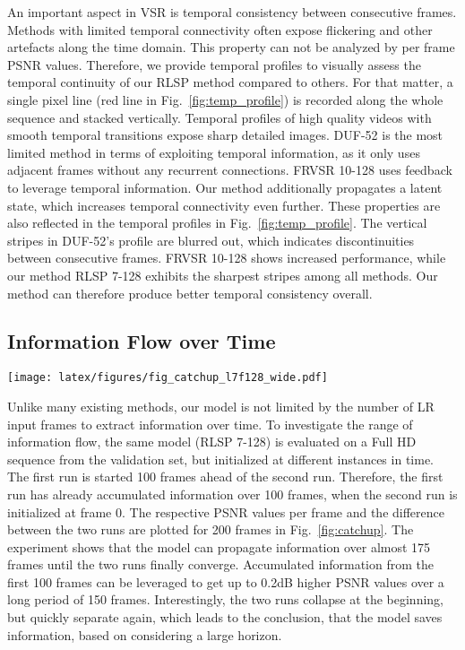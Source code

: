 \documentclass[10pt,twocolumn,letterpaper]{article}
\begin{document}
An important aspect in VSR is temporal consistency between consecutive frames. Methods with limited temporal connectivity often expose flickering and other artefacts along the time domain. This property can not be analyzed by per frame PSNR values. Therefore, we provide temporal profiles to visually assess the temporal continuity of our RLSP method compared to others. For that matter, a single pixel line (red line in Fig.~\ref{fig:temp_profile}) is recorded along the whole sequence and stacked vertically. Temporal profiles of high quality videos with smooth temporal transitions expose sharp detailed images. 
DUF-52 is the most limited method in terms of exploiting temporal information, as it only uses adjacent frames without any recurrent connections. FRVSR 10-128 uses feedback to leverage temporal information. Our method additionally propagates a latent state, which increases temporal connectivity even further.
These properties are also reflected in the temporal profiles in Fig.~\ref{fig:temp_profile}. The vertical stripes in DUF-52's profile are blurred out, which indicates discontinuities between consecutive frames. FRVSR 10-128 shows increased performance, while our method RLSP 7-128 exhibits the sharpest stripes among all methods. Our method can therefore produce better temporal consistency overall.


\subsection{Information Flow over Time}

\begin{figure*}[th!]
\begin{center}

\texttt{[image: latex/figures/fig\_catchup\_l7f128\_wide.pdf]}
\end{center}
   \caption{Information flow over time for model RLSP 7-128 on a validation video. Top: Absolute PSNR values, Bottom: Difference in PSNR per frame.}
\label{fig:catchup}
\end{figure*}

Unlike many existing methods, our model is not limited by the number of LR input frames to extract information over time. To investigate the range of information flow, the same model (RLSP 7-128) is evaluated on a Full HD sequence from the validation set, but initialized at different instances in time. The first run is started 100 frames ahead of the second run. Therefore, the first run has already accumulated information over 100 frames, when the second run is initialized at frame 0. The respective PSNR values per frame and the difference between the two runs are plotted for 200 frames in Fig.~\ref{fig:catchup}.
The experiment shows that the model can propagate information over almost 175 frames until the two runs finally converge. Accumulated information from the first 100 frames can be leveraged to get up to 0.2dB higher PSNR values over a long period of 150 frames. Interestingly, the two runs collapse at the beginning, but quickly separate again, which leads to the conclusion, that the model saves information, based on considering a large horizon.
\end{document}
